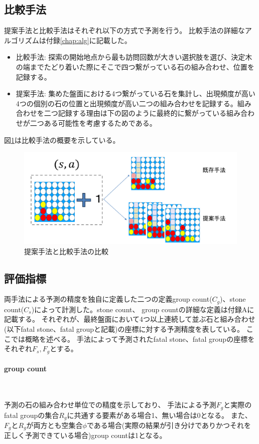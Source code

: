 \subsection{比較手法}
提案手法と比較手法はそれぞれ以下の方式で予測を行う。
比較手法の詳細なアルゴリズムは付録\ref{chap:alg}に記載した。
\newpage
\begin{itemize}
	\item 比較手法: 探索の開始地点から最も訪問回数が大きい選択肢を選び、決定木の端までたどり着いた際にそこで四つ繋がっている石の組み合わせ、位置を記録する。
	\item 提案手法: 集めた盤面における4つ繋がっている石を集計し、出現頻度が高い4つの個別の石の位置と出現頻度が高い二つの組み合わせを記録する。組み合わせを二つ記録する理由は下の図のように最終的に繋がっている組み合わせが二つある可能性を考慮するためである。
\end{itemize}
図\ref{fig:compare}は比較手法の概要を示している。
\begin{figure}[t]
	\centering
	\includegraphics[width=\linewidth]{./figure/compare.pdf}
	\caption{提案手法と比較手法の比較}
	\label{fig:compare}
\end{figure}

\subsection{評価指標}
両手法による予測の精度を独自に定義した二つの定義group count($C_g$)、stone count($C_s$)によって計測した。stone count、 group countの詳細な定義は付録Aに記載する。
それぞれが、最終盤面において4つ以上連続して並ぶ石と組み合わせ(以下fatal stone、fatal groupと記載)の座標に対する予測精度を表している。
ここでは概略を述べる。
手法によって予測されたfatal stone、fatal groupの座標をそれぞれ$F_s, F_g$とする。

\paragraph{group count}~
\par 予測の石の組み合わせ単位での精度を示しており、
手法による予測$F_g$と実際のfatal groupの集合$R_g$に共通する要素がある場合1、無い場合は0となる。
また、$F_g$と$R_g$が両方とも空集合$\phi$である場合(実際の結果が引き分けでありかつそれを正しく予測できている場合)group countは1となる。
